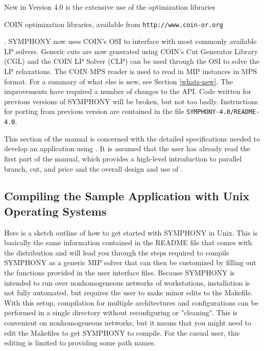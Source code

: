 New in Version 4.0 is the extensive use of the
\emph{}
optimization libraries 
\begin{latexonly} 
COIN optimization libraries,
available from \texttt{http://www.coin-or.org} 
\end{latexonly}.
SYMPHONY now uses COIN's OSI to interface with most commonly available LP
solvers. Generic cuts are now generated using COIN's Cut Generator Library
(CGL) and the COIN LP Solver (CLP) can be used through the OSI to solve the LP
relaxations. The COIN MPS reader is used to read in MIP instances in MPS
format. For a summary of what else is new, see Section \ref{whats-new}. The
improvements have required a number of changes to the API. Code written for
previous versions of SYMPHONY will be broken, but not too badly. Instructions
for porting from previous version are contained in the file
\texttt{SYMPHONY-4.0/README-4.0}.

This section of the manual is concerned with the detailed
specifications needed to develop an application using \BB. It is
assumed that the user has already read the first part of the manual, which
provides a high-level introduction to parallel branch, cut, and price
and the overall design and use of \BB. 


\subsection{Compiling the Sample Application with Unix Operating Systems}
\label{getting_started_unix}

Here is a sketch outline of how to get started with SYMPHONY in Unix. This is
basically the same information contained in the README file that comes with
the distribution and will lead you through the steps required to compile
SYMPHONY as a generic MIP solver that can then be customized by filling out
the functions provided in the user interface files. Because SYMPHONY is
intended to run over nonhomogeneous networks of workstations, installation is
not fully automated, but requires the user to make minor edits to the
Makefile.  With this setup, compilation for multiple architectures and
configurations can be performed in a single directory without reconfiguring or
"cleaning". This is convenient on nonhomogeneous networks, but it means that
you might need to edit the Makefiles to get SYMPHONY to compile. For the casual
user, this editing is limited to providing some path names.


